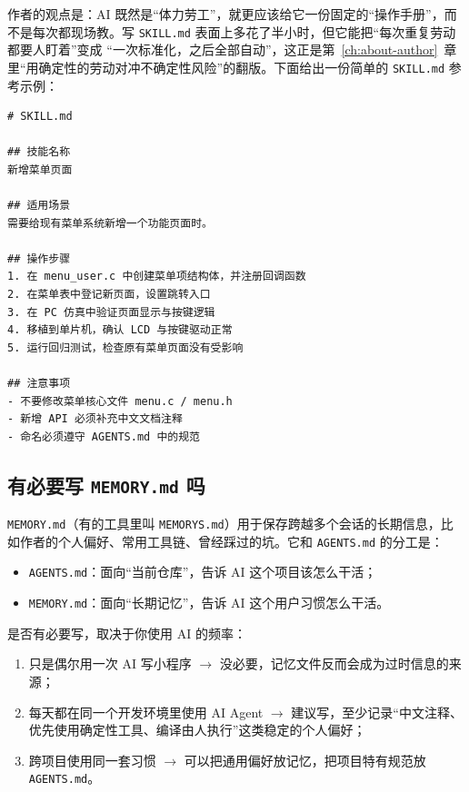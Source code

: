 作者的观点是：AI 既然是“体力劳工”，就更应该给它一份固定的“操作手册”，而不是每次都现场教。写 \texttt{SKILL.md} 表面上多花了半小时，但它能把“每次重复劳动都要人盯着”变成 “一次标准化，之后全部自动”，这正是第~\ref{ch:about-author}~章里“用确定性的劳动对冲不确定性风险”的翻版。下面给出一份简单的 \texttt{SKILL.md} 参考示例：

\begin{lstlisting}
# SKILL.md

## 技能名称
新增菜单页面

## 适用场景
需要给现有菜单系统新增一个功能页面时。

## 操作步骤
1. 在 menu_user.c 中创建菜单项结构体，并注册回调函数
2. 在菜单表中登记新页面，设置跳转入口
3. 在 PC 仿真中验证页面显示与按键逻辑
4. 移植到单片机，确认 LCD 与按键驱动正常
5. 运行回归测试，检查原有菜单页面没有受影响

## 注意事项
- 不要修改菜单核心文件 menu.c / menu.h
- 新增 API 必须补充中文文档注释
- 命名必须遵守 AGENTS.md 中的规范
\end{lstlisting}

\subsection{有必要写 \texttt{MEMORY.md} 吗}

\texttt{MEMORY.md}（有的工具里叫 \texttt{MEMORYS.md}）用于保存跨越多个会话的长期信息，比如作者的个人偏好、常用工具链、曾经踩过的坑。它和 \texttt{AGENTS.md} 的分工是：

\begin{itemize}
\item \texttt{AGENTS.md}：面向“当前仓库”，告诉 AI 这个项目该怎么干活；
\item \texttt{MEMORY.md}：面向“长期记忆”，告诉 AI 这个用户习惯怎么干活。
\end{itemize}

是否有必要写，取决于你使用 AI 的频率：

\begin{enumerate}
\item 只是偶尔用一次 AI 写小程序 $\rightarrow$ 没必要，记忆文件反而会成为过时信息的来源；
\item 每天都在同一个开发环境里使用 AI Agent $\rightarrow$ 建议写，至少记录“中文注释、优先使用确定性工具、编译由人执行”这类稳定的个人偏好；
\item 跨项目使用同一套习惯 $\rightarrow$ 可以把通用偏好放记忆，把项目特有规范放 \texttt{AGENTS.md}。
\end{enumerate}

